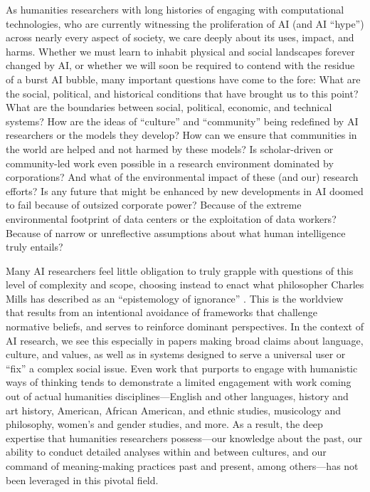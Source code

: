 As humanities researchers with long histories of engaging with computational technologies, who are currently witnessing the proliferation of AI (and AI “hype”) across nearly every aspect of society, we care deeply about its uses, impact, and harms. Whether we must learn to inhabit physical and social landscapes forever changed by AI, or whether we will soon be required to contend with the residue of a burst AI bubble, many important questions have come to the fore: What are the social, political, and historical conditions that have brought us to this point? What are the boundaries between social, political, economic, and technical systems? How are the ideas of ``culture'' and ``community'' being redefined by AI researchers or the models they develop? How can we ensure that communities in the world are helped and not harmed by these models? Is scholar-driven or community-led work even possible in a research environment dominated by corporations? And what of the environmental impact of these (and our) research efforts? Is any future that might be enhanced by new developments in AI doomed to fail because of outsized corporate power? Because of the extreme environmental footprint of data centers or the exploitation of data workers? Because of narrow or unreflective assumptions about what human intelligence truly entails?

Many AI researchers feel little obligation to truly grapple with questions of this level of complexity and scope, choosing instead to enact what philosopher Charles Mills has described as an ``epistemology of ignorance'' \cite{Mills_1999}. This is the worldview that results from an intentional avoidance of frameworks that challenge normative beliefs, and serves to reinforce dominant perspectives. In the context of AI research, we see this especially in papers making broad claims about language, culture, and values, as well as in systems designed to serve a universal user or ``fix'' a complex social issue. Even work that purports to engage with humanistic ways of thinking tends to demonstrate a limited engagement with work coming out of actual humanities disciplines---English and other languages, history and art history, American, African American, and ethnic studies, musicology and philosophy, women’s and gender studies, and more. As a result, the deep expertise that humanities researchers possess---our knowledge about the past, our ability to conduct detailed analyses within and between cultures, and our command of meaning-making practices past and present, among others---has not been leveraged in this pivotal field. 

